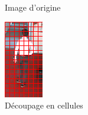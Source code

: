 \documentclass[11pt]{article}
\begin{document}
\begin{figure}[!ht]
\begin{subfigure}{.3\textwidth}
  \caption{Image d'origine}
  \label{fig:kernel_sx}
\end{subfigure}%
\begin{subfigure}{.3\textwidth}
  \centering
  \includegraphics[width=.8\linewidth]{crossed.png}
  \caption{Découpage en cellules}
  \label{fig:kernel_sy}
\end{subfigure}
\begin{subfigure}{.3\textwidth}
  \centering

\end{subfigure}
\end{figure}
\end{document}
